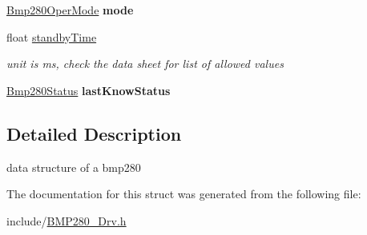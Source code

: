 \begin{DoxyCompactItemize}
\item 
\mbox{\label{structbmp280Sensor_a1ede7cfa22a6e883819ca4d79f9a3fb0}} 
\hyperlink{BMP280__Drv_8h_abd075292d5e9d310574c56eb88e4e05d}{Bmp280\+Oper\+Mode} {\bfseries mode}
\item 
\mbox{\label{structbmp280Sensor_a447ced7a284409400b6a876cb9f4289f}} 
float \hyperlink{structbmp280Sensor_a447ced7a284409400b6a876cb9f4289f}{standby\+Time}
\begin{DoxyCompactList}\small\item\em unit is ms, check the data sheet for list of allowed values \end{DoxyCompactList}\item 
\mbox{\label{structbmp280Sensor_a2bc1ea828a10e386b40c90e170390b7d}} 
\hyperlink{structBmp280Status}{Bmp280\+Status} {\bfseries last\+Know\+Status}
\end{DoxyCompactItemize}


\subsection{Detailed Description}
data structure of a bmp280 

The documentation for this struct was generated from the following file\+:\begin{DoxyCompactItemize}
\item 
include/\hyperlink{BMP280__Drv_8h}{B\+M\+P280\+\_\+\+Drv.\+h}\end{DoxyCompactItemize}
